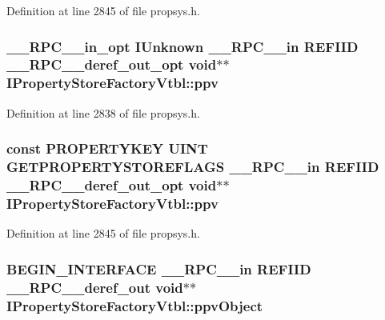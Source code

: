 Definition at line 2845 of file propsys.\+h.

\subsubsection[{\texorpdfstring{ppv}{ppv}}]{ {\bf \+\_\+\+\_\+\+R\+P\+C\+\_\+\+\_\+in\+\_\+opt} I\+Unknown {\bf \+\_\+\+\_\+\+R\+P\+C\+\_\+\+\_\+in} {\bf R\+E\+F\+I\+ID} {\bf \+\_\+\+\_\+\+R\+P\+C\+\_\+\+\_\+deref\+\_\+out\+\_\+opt} {\bf void}$\ast$$\ast$ I\+Property\+Store\+Factory\+Vtbl\+::ppv}\hypertarget{struct_i_property_store_factory_vtbl_a91a9e9534a0626d6c9d7780e0f95e639}{}\label{struct_i_property_store_factory_vtbl_a91a9e9534a0626d6c9d7780e0f95e639}


Definition at line 2838 of file propsys.\+h.

\subsubsection[{\texorpdfstring{ppv}{ppv}}]{ {\bf const} {\bf P\+R\+O\+P\+E\+R\+T\+Y\+K\+EY} {\bf U\+I\+NT} {\bf G\+E\+T\+P\+R\+O\+P\+E\+R\+T\+Y\+S\+T\+O\+R\+E\+F\+L\+A\+GS} {\bf \+\_\+\+\_\+\+R\+P\+C\+\_\+\+\_\+in} {\bf R\+E\+F\+I\+ID} {\bf \+\_\+\+\_\+\+R\+P\+C\+\_\+\+\_\+deref\+\_\+out\+\_\+opt} {\bf void}$\ast$$\ast$ I\+Property\+Store\+Factory\+Vtbl\+::ppv}\hypertarget{struct_i_property_store_factory_vtbl_adbaf31ab333359d858e340d1a2582ba7}{}\label{struct_i_property_store_factory_vtbl_adbaf31ab333359d858e340d1a2582ba7}


Definition at line 2845 of file propsys.\+h.

\subsubsection[{\texorpdfstring{ppv\+Object}{ppvObject}}]{\setlength{\rightskip}{0pt plus 5cm}B\+E\+G\+I\+N\+\_\+\+I\+N\+T\+E\+R\+F\+A\+CE {\bf \+\_\+\+\_\+\+R\+P\+C\+\_\+\+\_\+in} {\bf R\+E\+F\+I\+ID} {\bf \+\_\+\+\_\+\+R\+P\+C\+\_\+\+\_\+deref\+\_\+out} {\bf void}$\ast$$\ast$ I\+Property\+Store\+Factory\+Vtbl\+::ppv\+Object}\hypertarget{struct_i_property_store_factory_vtbl_af55565032f3fb2f5f1445eaf72f4ab18}{}\label{struct_i_property_store_factory_vtbl_af55565032f3fb2f5f1445eaf72f4ab18}


